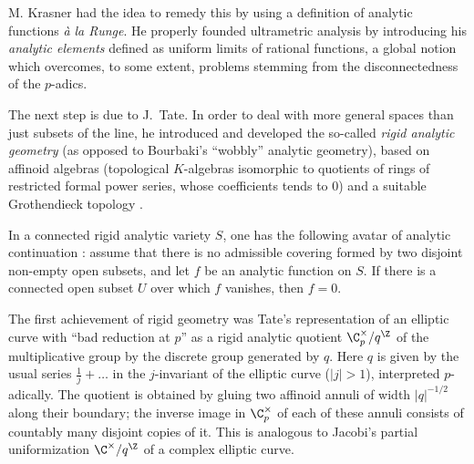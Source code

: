 \begin{para}
 M. Krasner had the idea to remedy this by using a definition of
 analytic functions \emph{\`a la Runge}.
 He properly founded ultrametric analysis by introducing his \emph{analytic
 elements} defined as
 uniform limits of rational functions, a global notion which overcomes,
 to some extent, problems stemming from the disconnectedness of the $p$-adics.

 The next step is due to J.~Tate. In order to deal with more general spaces
 than just subsets of the line, he introduced and developed the
 so-called \emph{rigid analytic geometry} (as opposed to Bourbaki's
 ``wobbly'' analytic geometry), based on affinoid algebras (topological
 $K$-algebras isomorphic to quotients of rings of restricted formal
 power series, \ie whose coefficients tends to $0$) and a suitable
 Grothendieck topology \cite{ras}.

 In a connected rigid analytic variety $S$, one has the following 
 avatar of analytic continuation \cite[0.1.13]{crecrasp}:  assume that
 there is no admissible covering formed by two disjoint non-empty open
 subsets, and let $f$ be an analytic function 
 on $S$. If there is a connected open subset $U$ over which $f$ 
 vanishes, then $f=0$.
\end{para}

\begin{para}
 The first achievement of rigid geometry was Tate's representation of an
 elliptic curve with ``bad reduction at $p$'' as a rigid analytic quotient
 $\C_p^{\times}/q^{\Z}$ of the multiplicative group by the discrete
 group generated by $q$.  Here $q$ is given by the usual series
 $\frac{1}{j}+\ldots$ in the $j$-invariant of the elliptic 
 curve ($|j| >1$), interpreted $p$-adically.  The quotient is
 obtained by gluing two affinoid annuli of width $|q|^{-1/2}$
 along their boundary; the inverse image in $\C_p^{\times}$ of each of
 these annuli consists of countably many disjoint copies of it.  This is
 analogous to Jacobi's partial uniformization $\C^{\times}/q^{\Z}$
 of a complex elliptic curve.
\end{para}

